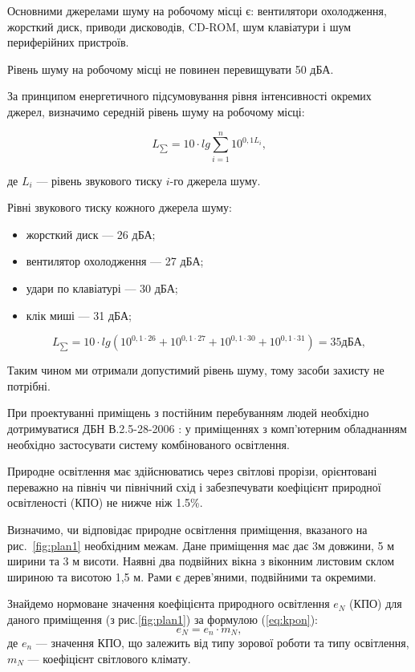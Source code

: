 \documentclass{diploma}
\begin{document}
Основними джерелами шуму на робочому місці є: вентилятори охолодження, жорсткий диск, приводи дисководів, CD-ROM, шум клавіатури і шум периферійних пристроїв.

Рівень шуму на робочому місці не повинен перевищувати 50 дБА. 

За принципом енергетичного підсумовування рівня інтенсивності окремих джерел, визначимо середній рівень шуму на робочому місці:

$$L_{\sum} = 10\cdot lg\sum_{i=1}^n 10^{0,1L_i},$$

де $L_i$ --- рівень звукового тиску $i$-го джерела шуму.

Рівні звукового тиску кожного джерела шуму:

\begin{itemize}
\item жорсткий диск --- 26 дБА;
\item вентилятор охолодження --- 27 дБА;
\item удари по клавіатурі --- 30 дБА;
\item клік миші --- 31 дБА;
\end{itemize}

$$L_{\sum} = 10\cdot lg(10^{0,1\cdot 26} + 10^{0,1\cdot 27} + 10^{0,1\cdot 30} + 10^{0,1\cdot 31}) = 35 дБА,$$

Таким чином ми отримали допустимий рівень шуму, тому засоби захисту не потрібні.


При проектуванні приміщень з постійним перебуванням людей необхідно дотримуватися ДБН В.2.5-28-2006 \cite{oh2}: у приміщеннях з комп'ютерним обладнанням необхідно застосувати систему комбінованого освітлення.

Природне освітлення має здійснюватись через світлові прорізи, 
орієнтовані переважно на північ чи північний схід і забезпечувати коефіцієнт 
природної освітленості (КПО) не нижче ніж 1.5\%.

Визначимо, чи відповідає природне освітлення приміщення, вказаного на рис.~\ref{fig:plan1} необхідним межам.
Дане приміщення має дає 3м довжини, 5 м ширини та 3 м висоти. Наявні два подвійних вікна з віконним листовим склом  шириною та висотою 1,5 м. Рами є дерев’яними, подвійними та окремими.
	
Знайдемо нормоване значення коефіцієнта природного освітлення $e_N$ (КПО) для даного приміщення (з рис.\ref{fig:plan1}) за формулою (\ref{eq:kpon}): 
\begin{equation}
e_{N} = e_{n}\cdot m_{N}, \label{eq:kpon}
\end{equation}
де $e_{n}$ --- значення КПО, що залежить від типу зорової роботи та типу освітлення, $m_{N}$ --- коефіцієнт світлового клімату.
\end{document}

